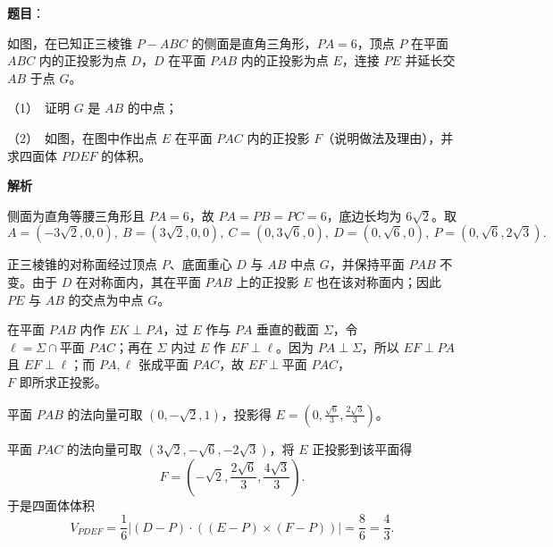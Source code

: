\begin{answer}

\textbf{题目}：

如图，在已知正三棱锥 \(P-ABC\) 的侧面是直角三角形，\(PA=6\)，顶点 \(P\) 在平面 \(ABC\) 内的正投影为点 \(D\)，\(D\) 在平面 \(PAB\) 内的正投影为点 \(E\)，连接 \(PE\) 并延长交 \(AB\) 于点 \(G\)。
\nopagebreak[4]
\begin{center}\end{center}
\nopagebreak[4]
   （1）　证明 \(G\) 是 \(AB\) 的中点；

   （2）　如图，在图中作出点 \(E\) 在平面 \(PAC\) 内的正投影 \(F\)（说明做法及理由），并求四面体 \(PDEF\) 的体积。

\textbf{解析}

侧面为直角等腰三角形且 \(PA=6\)，故 \(PA=PB=PC=6\)，底边长均为 \(6\sqrt2\)。取
\nopagebreak[4]
\[
A=(-3\sqrt2,0,0),\ B=(3\sqrt2,0,0),\ C=(0,3\sqrt6,0),\
D=(0,\sqrt6,0),\ P=(0,\sqrt6,2\sqrt3).
\]


正三棱锥的对称面经过顶点 \(P\)、底面重心 \(D\) 与 \(AB\) 中点 \(G\)，并保持平面 \(PAB\) 不变。由于 \(D\) 在对称面内，其在平面 \(PAB\) 上的正投影 \(E\) 也在该对称面内；因此 \(PE\) 与 \(AB\) 的交点为中点 \(G\)。


在平面 \(PAB\) 内作 \(EK\perp PA\)，过 \(E\) 作与 \(PA\) 垂直的截面 \(\Sigma\)，令 \(\ell=\Sigma\cap\text{平面 }PAC\)；再在 \(\Sigma\) 内过 \(E\) 作 \(EF\perp\ell\)。因为 \(PA\perp\Sigma\)，所以 \(EF\perp PA\) 且 \(EF\perp\ell\)；而 \(PA,\ell\) 张成平面 \(PAC\)，故 \(EF\perp\text{平面 }PAC\)，\\
\(F\) 即所求正投影。

平面 \(PAB\) 的法向量可取 \((0,-\sqrt2,1)\)，投影得 \(E=(0,\frac{\sqrt6}{3},\frac{2\sqrt3}{3})\)。

平面 \(PAC\) 的法向量可取 \((3\sqrt2,-\sqrt6,-2\sqrt3)\)，将 \(E\) 正投影到该平面得
\nopagebreak[4]
\[
F=(-\sqrt2,\frac{2\sqrt6}{3},\frac{4\sqrt3}{3}).
\]
于是四面体体积
\nopagebreak[4]
\[
V_{PDEF}=\frac16\left|(D-P)\cdot((E-P)\times(F-P))\right|=\frac86=\frac43.
\]



\end{answer}
